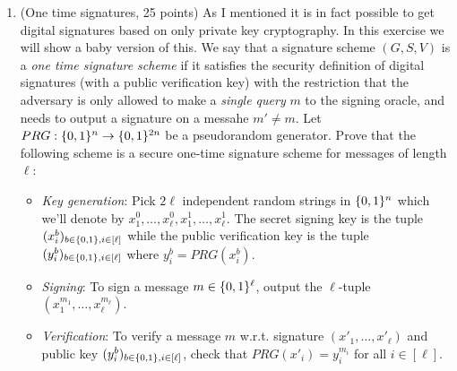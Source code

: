 \documentclass{article}
\begin{document}
\begin{enumerate}
\item{}
(One time signatures, 25 points) As I mentioned it is in fact possible to get digital signatures based on only private key cryptography. In this exercise we will show a baby version of this. We say that a signature scheme $(G,S,V)$ is a \emph{one time signature scheme} if it satisfies the security definition of digital signatures (with a public verification key) with the restriction that the adversary is only allowed to make a \emph{single query} $m$ to the signing oracle, and needs to output a signature on a messahe $m' \neq m$. Let $PRG:\{0,1\}^n\rightarrow\{0,1\}^{2n}$ be a pseudorandom generator. Prove that the following scheme is a secure one-time signature scheme for messages of length $\ell$:%

\begin{itemize}%

\item{}
\emph{Key generation}: Pick $2\ell$ independent random strings in $\{0,1\}^n$ which we'll denote by $x^0_1,\ldots,x^0_\ell,x^1_1,\ldots,x^1_\ell$. The secret signing key is the tuple $( x^b_i )_{b\in\{0,1\},i\in[\ell]}$  while the public verification key is the tuple $( y^b_i )_{b\in\{0,1\},i\in[\ell]}$ where $y_i^b = PRG(x_i^b)$.%

\item{}
\emph{Signing}: To sign a message $m\in \{0,1\}^\ell$, output the $\ell$-tuple $(x^{m_1}_1,\ldots,x^{m_\ell}_\ell)$.%

\item{}
\emph{Verification}: To verify a message $m$ w.r.t. signature $(x'_1,\ldots,x'_\ell)$ and public key $( y^b_i )_{b\in\{0,1\},i\in[\ell]}$, check that $PRG(x'_i)=y^{m_i}_i$ for all $i\in[\ell]$.%


\end{itemize}
\end{enumerate}
\end{document}
